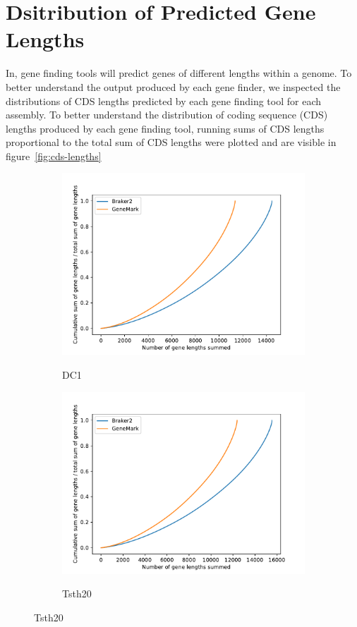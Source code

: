 \section{Dsitribution of Predicted Gene Lengths}

In, gene finding tools will predict genes of different lengths within
a genome. To better understand the output produced by each gene
finder, we inspected the distributions of CDS lengths predicted by
each gene finding tool for each assembly. To better understand the
distribution of coding sequence (CDS) lengths produced by each gene
finding tool, running sums of CDS lengths proportional to the total
sum of CDS lengths were plotted and are visible in
figure~\ref{fig:cds-lengths}

\begin{figure}
  \centering
    \begin{subfigure}{0.8\textwidth}
      \includegraphics[width=\textwidth]{figures/dc1-cumulative-gene-lengths.pdf}
      \label{fig:dc1-lengths}
      \caption{DC1}
    \end{subfigure}
    \begin{subfigure}{0.8\textwidth}
      \includegraphics[width=\textwidth]{figures/tsth20-cumulative-gene-lengths.pdf}
      \label{fig:tsth20-lengths}
      \caption{Tsth20}
    \end{subfigure}
\end{figure}
